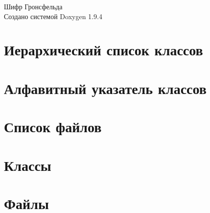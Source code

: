 \documentclass[twoside]{book}
\newcommand{\+}{\discretionary{\mbox{\scriptsize$\hookleftarrow$}}{}{}}
\newcommand{\clearemptydoublepage}{%
    \newpage{\pagestyle{empty}\cleardoublepage}%
  }
\begin{document}
  \raggedbottom
    \hypersetup{pageanchor=false,
                bookmarksnumbered=true,
                pdfencoding=unicode
               }
  \begin{titlepage}
  \vspace*{7cm}
  \begin{center}%
  {\Large Шифр Гронсфельда}\\
  \vspace*{1cm}
  {\large Создано системой Doxygen 1.9.4}\\
  \end{center}
  \end{titlepage}
  \clearemptydoublepage
  \tableofcontents
  \clearemptydoublepage
  \hypersetup{pageanchor=true}
\chapter{Иерархический список классов}

\chapter{Алфавитный указатель классов}

\chapter{Список файлов}

\chapter{Классы}


\chapter{Файлы}




  \backmatter
  \newpage
  \clearemptydoublepage
  \printindex
\end{document}
